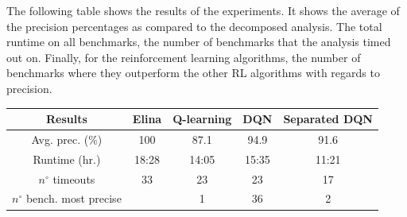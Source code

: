 The following table shows the results of the experiments. It shows the average of the precision percentages as compared to the decomposed analysis. The total runtime on all benchmarks, the number of benchmarks that the analysis timed out on. Finally, for the reinforcement learning algorithms, the number of benchmarks where they outperform the other RL algorithms with regards to precision.

\begin{center}
\begin{tabular}{||c c c c c||}
 
 \hline
 Results & Elina & Q-learning & DQN & Separated DQN \\ [0.5ex] 
 \hline\hline
 Avg. prec. (\%) & 100 & 87.1 & 94.9 & 91.6\\
 Runtime (hr.) & 18:28 & 14:05 & 15:35 & 11:21\\
 $n^{\circ}$ timeouts & 33 & 23 & 23 & 17\\
 $n^{\circ}$ bench. most precise &  & 1 & 36 & 2\\
 
 \hline
\end{tabular}
\end{center}

